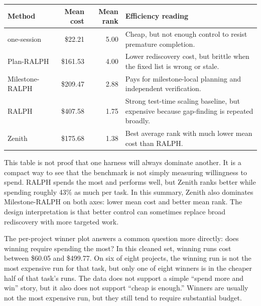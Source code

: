 \documentclass[11pt,a4paper]{article}
\renewcommand{\arraystretch}{1.18}
\newcommand{\code}[1]{#1}
\begin{document}
\begingroup
\renewcommand{\arraystretch}{1.25}
\setlength{\tabcolsep}{6pt}
\footnotesize
\noindent\begin{tabular}{@{}lrrp{8.0cm}@{}}
\toprule
\rowcolor{tablehead}\textbf{\color{white}Method} & \textbf{\color{white}Mean cost} & \textbf{\color{white}Mean rank} & \textbf{\color{white}Efficiency reading} \\
\midrule
\code{one-session}     & \code{\$22.21}  & \code{5.00} & Cheap, but not enough control to resist premature completion. \\
\rowcolor{tableband}
\code{Plan-RALPH}      & \code{\$161.53} & \code{4.00} & Lower rediscovery cost, but brittle when the fixed list is wrong or stale. \\
\code{Milestone-RALPH} & \code{\$209.47} & \code{2.88} & Pays for milestone-local planning and independent verification. \\
\rowcolor{tableband}
\code{RALPH}           & \code{\$407.58} & \code{1.75} & Strong test-time scaling baseline, but expensive because gap-finding is repeated broadly. \\
\code{Zenith}          & \code{\$175.68} & \code{1.38} & Best average rank with much lower mean cost than RALPH. \\
\bottomrule
\end{tabular}
\endgroup

\vspace{6pt}

This table is not proof that one harness will always dominate another. It is a compact way to see that the benchmark is not simply measuring willingness to spend. \code{RALPH} spends the most and performs well, but \code{Zenith} ranks better while spending roughly \code{43\%} as much per task. In this summary, \code{Zenith} also dominates \code{Milestone-RALPH} on both axes: lower mean cost and better mean rank. The design interpretation is that better control can sometimes replace broad rediscovery with more targeted work.

The per-project winner plot answers a common question more directly: does winning require spending the most? In this cleaned set, winning runs cost between \code{\$60.05} and \code{\$499.77}. On six of eight projects, the winning run is not the most expensive run for that task, but only one of eight winners is in the cheaper half of that task's runs. The data does not support a simple ``spend more and win'' story, but it also does not support ``cheap is enough.'' Winners are usually not the most expensive run, but they still tend to require substantial budget.
\end{document}
